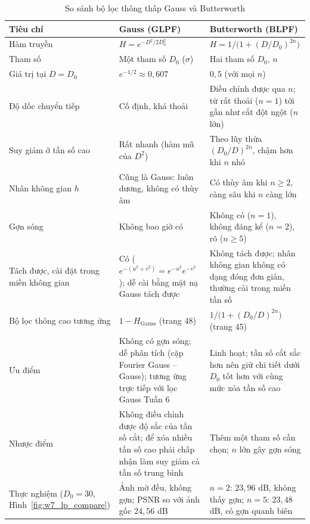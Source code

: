 \begin{table}[ht]
\centering
\scriptsize
\caption{So sánh bộ lọc thông thấp Gauss và Butterworth}
\label{tab:w7_glpf_blpf}
\renewcommand{\arraystretch}{1.3}
\begin{tabularx}{\textwidth}{|p{2.3cm}|X|X|}
\hline
\textbf{Tiêu chí} & \textbf{Gauss (GLPF)} & \textbf{Butterworth (BLPF)} \\
\hline
Hàm truyền & $H = e^{-D^2/2D_0^2}$ & $H = 1/\big(1 + (D/D_0)^{2n}\big)$ \\
\hline
Tham số & Một tham số $D_0$ ($\sigma$) & Hai tham số $D_0$, $n$ \\
\hline
Giá trị tại $D = D_0$ & $e^{-1/2} \approx 0{,}607$ & $0{,}5$ (với mọi $n$) \\
\hline
Độ dốc chuyển tiếp & Cố định, khá thoải & Điều chỉnh được qua $n$; từ rất thoải ($n = 1$) tới gần như cắt đột ngột ($n$ lớn) \\
\hline
Suy giảm ở tần số cao & Rất nhanh (hàm mũ của $D^2$) & Theo lũy thừa $(D_0/D)^{2n}$, chậm hơn khi $n$ nhỏ \\
\hline
Nhân không gian $h$ & Cũng là Gauss: luôn dương, không có thùy âm & Có thùy âm khi $n \ge 2$, càng sâu khi $n$ càng lớn \\
\hline
Gợn sóng & Không bao giờ có & Không có ($n = 1$), không đáng kể ($n = 2$), rõ ($n \ge 5$) \\
\hline
Tách được, cài đặt trong miền không gian & Có ($e^{-(u^2 + v^2)} = e^{-u^2}e^{-v^2}$); dễ cài bằng mặt nạ Gauss tách được & Không tách được; nhân không gian không có dạng đóng đơn giản, thường cài trong miền tần số \\
\hline
Bộ lọc thông cao tương ứng & $1 - H_{\text{Gauss}}$ (trang 48) & $1/\big(1 + (D_0/D)^{2n}\big)$ (trang 45) \\
\hline
Ưu điểm & Không có gợn sóng; dễ phân tích (cặp Fourier Gauss -- Gauss); tương ứng trực tiếp với lọc Gauss Tuần 6 & Linh hoạt; tần số cắt sắc hơn nên giữ chi tiết dưới $D_0$ tốt hơn với cùng mức xóa tần số cao \\
\hline
Nhược điểm & Không điều chỉnh được độ sắc của tần số cắt; để xóa nhiều tần số cao phải chấp nhận làm suy giảm cả tần số trung bình & Thêm một tham số cần chọn; $n$ lớn gây gợn sóng \\
\hline
Thực nghiệm ($D_0 = 30$, Hình~\ref{fig:w7_lp_compare}) & Ảnh mờ đều, không gợn; PSNR so với ảnh gốc $24{,}56$ dB & $n = 2$: $23{,}96$ dB, không thấy gợn; $n = 5$: $23{,}48$ dB, có gợn quanh biên \\
\hline
\end{tabularx}
\end{table}

